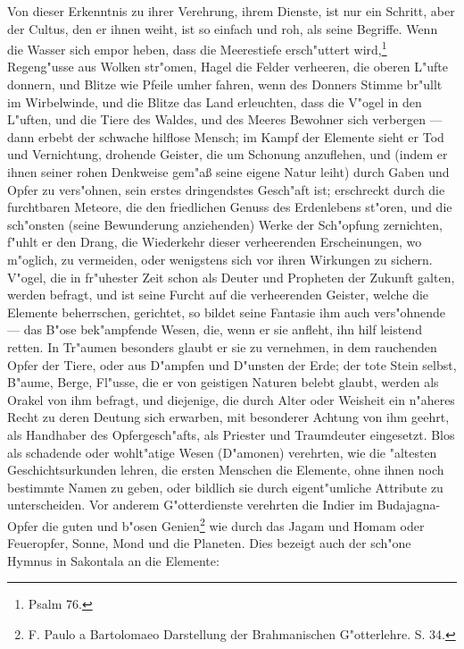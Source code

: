 \documentclass[a4paper, 11pt, oneside, polutonikogreek, german]{article}
\begin{document}
Von dieser Erkenntnis zu ihrer Verehrung, ihrem Dienste, ist nur ein Schritt, aber der Cultus, den er ihnen weiht, ist so einfach und roh, als seine Begriffe. Wenn die Wasser sich empor heben, dass die Meerestiefe ersch"uttert wird,\footnote{Psalm 76.} Regeng"usse aus Wolken str"omen, Hagel die Felder verheeren, die oberen L"ufte donnern, und Blitze wie Pfeile umher fahren, wenn des Donners Stimme br"ullt im Wirbelwinde, und die Blitze das Land erleuchten, dass die V"ogel in den L"uften, und die Tiere des Waldes, und des Meeres Bewohner sich verbergen --- dann erbebt der schwache hilflose Mensch; im Kampf der Elemente sieht er Tod und Vernichtung, drohende Geister, die um Schonung anzuflehen, und (indem er ihnen seiner rohen Denkweise gem"aß seine eigene Natur leiht) durch Gaben und Opfer zu vers"ohnen, sein erstes dringendstes Gesch"aft ist; erschreckt durch die furchtbaren Meteore, die den friedlichen Genuss des Erdenlebens st"oren, und die sch"onsten (seine Bewunderung anziehenden) Werke der Sch"opfung zernichten, f"uhlt er den Drang, die Wiederkehr dieser verheerenden Erscheinungen, wo m"oglich, zu vermeiden, oder wenigstens sich vor ihren Wirkungen zu sichern. V"ogel, die in fr"uhester Zeit schon als Deuter und Propheten der Zukunft galten, werden befragt, und ist seine Furcht auf die verheerenden Geister, welche die Elemente beherrschen, gerichtet, so bildet seine Fantasie ihm auch vers"ohnende --- das B"ose bek"ampfende Wesen, die, wenn er sie anfleht, ihn hilf leistend retten. In Tr"aumen besonders glaubt er sie zu vernehmen, in dem rauchenden Opfer der Tiere, oder aus D"ampfen und D"unsten der Erde; der tote Stein selbst, B"aume, Berge, Fl"usse, die er von geistigen Naturen belebt glaubt, werden als Orakel von ihm befragt, und diejenige, die durch Alter oder Weisheit ein n"aheres Recht zu deren Deutung sich erwarben, mit besonderer Achtung von ihm geehrt, als Handhaber des Opfergesch"afts, als Priester und Traumdeuter eingesetzt. Blos als schadende oder wohlt"atige Wesen (D"amonen) verehrten, wie die "altesten Geschichtsurkunden lehren, die ersten Menschen die Elemente, ohne ihnen noch bestimmte Namen zu geben, oder bildlich sie durch eigent"umliche Attribute zu unterscheiden. Vor anderem G"otterdienste verehrten die Indier im Budajagna-Opfer die guten und b"osen Genien\footnote{F. Paulo a Bartolomaeo Darstellung der Brahmanischen G"otterlehre. S. 34.} wie durch das Jagam und Homam oder Feueropfer, Sonne, Mond und die Planeten. Dies bezeigt auch der sch"one Hymnus in Sakontala an die Elemente:
\vspace{9pt}
\end{document}
